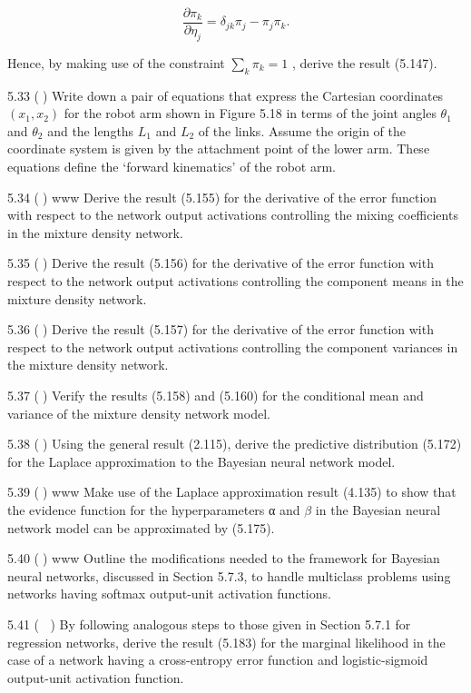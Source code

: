 \documentclass[
  10
]{article}
\begin{document}
\[
\frac {\partial \pi_ {k}}{\partial \eta_ {j}} = \delta_ {j k} \pi_ {j} - \pi_ {j} \pi_ {k}.\tag{5.208}
\]

Hence, by making use of the constraint
\(\textstyle \sum _ { k } \pi _ { k } = 1\) , derive the result (5.147).

5.33 () Write down a pair of equations that express the Cartesian
coordinates \(( x _ { 1 } , x _ { 2 } )\) for the robot arm shown in
Figure 5.18 in terms of the joint angles \(\theta _ { 1 }\) and
\(\theta _ { 2 }\) and the lengths \(L _ { 1 }\) and \(L _ { 2 }\) of
the links. Assume the origin of the coordinate system is given by the
attachment point of the lower arm. These equations define the `forward
kinematics' of the robot arm.

5.34 () www Derive the result (5.155) for the derivative of the error
function with respect to the network output activations controlling the
mixing coefficients in the mixture density network.

5.35 () Derive the result (5.156) for the derivative of the error
function with respect to the network output activations controlling the
component means in the mixture density network.

5.36 () Derive the result (5.157) for the derivative of the error
function with respect to the network output activations controlling the
component variances in the mixture density network.

5.37 () Verify the results (5.158) and (5.160) for the conditional mean
and variance of the mixture density network model.

5.38 () Using the general result (2.115), derive the predictive
distribution (5.172) for the Laplace approximation to the Bayesian
neural network model.

5.39 () www Make use of the Laplace approximation result (4.135) to show
that the evidence function for the hyperparameters α and \(\beta\) in
the Bayesian neural network model can be approximated by (5.175).

5.40 () www Outline the modifications needed to the framework for
Bayesian neural networks, discussed in Section 5.7.3, to handle
multiclass problems using networks having softmax output-unit activation
functions.

5.41 ( ) By following analogous steps to those given in Section 5.7.1
for regression networks, derive the result (5.183) for the marginal
likelihood in the case of a network having a cross-entropy error
function and logistic-sigmoid output-unit activation function.
\end{document}
